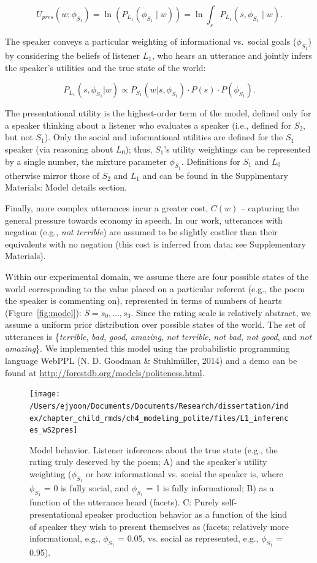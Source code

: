 \documentclass[oneside]{report}
\begin{document}
\[U_{pres}(w; \phi_{S_1}) = \ln(P_{L_1}(\phi_{S_1} \mid w)) = \ln \int_s P_{L_1}(s, \phi_{S_1} \mid w).\]

\noindent The speaker conveys a particular weighting of informational
vs.~social goals (\(\phi_{S_1}\)) by considering the beliefs of listener
\(L_1\), who hears an utterance and jointly infers the speaker's
utilities and the true state of the world:

\[P_{L_1}(s, \phi_{S_1} | w) \propto P_{S_1}(w | s, \phi_{S_1}) \cdot P(s) \cdot P(\phi_{S_1}).\]

\noindent The presentational utility is the highest-order term of the
model, defined only for a speaker thinking about a listener who
evaluates a speaker (i.e., defined for \(S_2\), but not \(S_1\)). Only
the social and informational utilities are defined for the \(S_1\)
speaker (via reasoning about \(L_0\)); thus, \(S_1\)'s utility
weightings can be represented by a single number, the mixture parameter
\(\phi_{S_1}\). Definitions for \(S_1\) and \(L_0\) otherwise mirror
those of \(S_2\) and \(L_1\) and can be found in the Supplmentary
Materials: Model details section.

Finally, more complex utterances incur a greater cost, \(C(w)\) --
capturing the general pressure towards economy in speech. In our work,
utterances with negation (e.g., \emph{not terrible}) are assumed to be
slightly costlier than their equivalents with no negation (this cost is
inferred from data; see Supplementary Materials).

Within our experimental domain, we assume there are four possible states
of the world corresponding to the value placed on a particular referent
(e.g., the poem the speaker is commenting on), represented in terms of
numbers of hearts (Figure~\ref{fig:model}): \(S = {s_0,...,s_3}\). Since
the rating scale is relatively abstract, we assume a uniform prior
distribution over possible states of the world. The set of utterances is
\{\emph{terrible}, \emph{bad}, \emph{good}, \emph{amazing}, \emph{not
terrible}, \emph{not bad}, \emph{not good}, and \emph{not amazing}\}. We
implemented this model using the probabilistic programming language
WebPPL (N. D. Goodman \& Stuhlmüller, 2014) and a demo can be found at
\url{http://forestdb.org/models/politeness.html}.
\begin{figure}[!t]

{\centering \texttt{[image: /Users/ejyoon/Documents/Documents/Research/dissertation/index/chapter\_child\_rmds/ch4\_modeling\_polite/files/L1\_inferences\_wS2pres]} 

}

\caption[Schmatic model predictions.]{Model behavior. Listener inferences about the true state (e.g., the rating truly deserved by the poem; A) and the speaker's utility weighting ($\phi_{S_1}$ or how informational vs. social the speaker is, where $\phi_{S_1}$ = 0 is fully social, and $\phi_{S_1}$ = 1 is fully informational; B) as a function of the utterance heard (facets). C: Purely self-presentational speaker production behavior as a function of the kind of speaker they wish to present themselves as (facets; relatively more informational, e.g., $\phi_{S_1}$ = 0.05, vs. social as represented, e.g., $\phi_{S_1}$ = 0.95).}\label{fig:L1inferences}
\end{figure}
\end{document}
